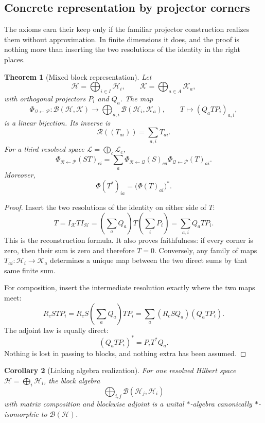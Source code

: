 \documentclass[11pt]{article}
\newtheorem{theorem}{Theorem}[section]
\newtheorem{corollary}[theorem]{Corollary}
\theoremstyle{definition}
\theoremstyle{remark}
\begin{document}
\subsection{Concrete representation by projector corners}

The axioms earn their keep only if the familiar projector construction realizes them without approximation.  In finite dimensions it does, and the proof is nothing more than inserting the two resolutions of the identity in the right places.

\begin{theorem}[Mixed block representation]
Let
\[
\mathcal H=\bigoplus_{i\in I}\mathcal H_i,
\qquad
\mathcal K=\bigoplus_{a\in A}\mathcal K_a,
\]
with orthogonal projectors \(P_i\) and \(Q_a\).  The map
\[
\Phi_{\mathcal Q\leftarrow\mathcal P}:
\mathcal B(\mathcal H,\mathcal K)
\longrightarrow
\bigoplus_{a,i}\mathcal B(\mathcal H_i,\mathcal K_a),
\qquad
T\longmapsto(Q_aTP_i)_{a,i},
\]
is a linear bijection.  Its inverse is
\[
\mathcal R((T_{ai}))=\sum_{a,i}T_{ai}.
\]
For a third resolved space \(\mathcal L=\bigoplus_c\mathcal L_c\),
\[
\Phi_{\mathcal R\leftarrow\mathcal P}(ST)_{ci}
=
\sum_a
\Phi_{\mathcal R\leftarrow\mathcal Q}(S)_{ca}
\Phi_{\mathcal Q\leftarrow\mathcal P}(T)_{ai}.
\]
Moreover,
\[
\Phi(T^*)_{ia}=\bigl(\Phi(T)_{ai}\bigr)^*.
\]
\end{theorem}

\begin{proof}
Insert the two resolutions of the identity on either side of \(T\):
\[
T
=I_\mathcal KTI_\mathcal H
=\left(\sum_aQ_a\right)T\left(\sum_iP_i\right)
=\sum_{a,i}Q_aTP_i.
\]
This is the reconstruction formula.  It also proves faithfulness: if every corner is zero, then their sum is zero and therefore \(T=0\).  Conversely, any family of maps \(T_{ai}:\mathcal H_i\to\mathcal K_a\) determines a unique map between the two direct sums by that same finite sum.

For composition, insert the intermediate resolution exactly where the two maps meet:
\[
R_cSTP_i
=R_cS\left(\sum_aQ_a\right)TP_i
=\sum_a(R_cSQ_a)(Q_aTP_i).
\]
The adjoint law is equally direct:
\[
(Q_aTP_i)^*=P_iT^*Q_a.
\]
Nothing is lost in passing to blocks, and nothing extra has been assumed.
\end{proof}

\begin{corollary}[Linking algebra realization]
For one resolved Hilbert space \(\mathcal H=\bigoplus_i\mathcal H_i\), the block algebra
\[
\bigoplus_{i,j}\mathcal B(\mathcal H_j,\mathcal H_i)
\]
with matrix composition and blockwise adjoint is a unital \(*\)-algebra canonically \(*\)-isomorphic to \(\mathcal B(\mathcal H)\).
\end{corollary}
\end{document}
